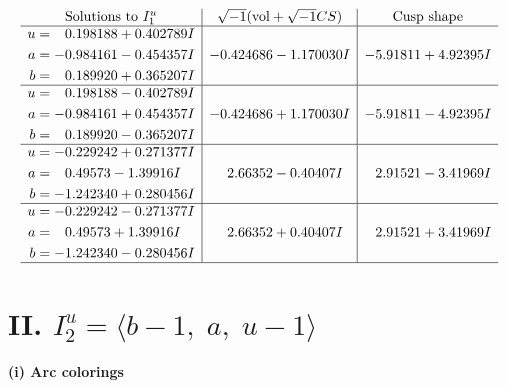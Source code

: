 \documentclass[1p]{elsarticle_modified}
\theoremstyle{definition}
\newcommand{\I}{\sqrt{-1}}
\begin{document}
$$\begin{array}{c|c|c}
\text{Solutions to }I^u_{1}& \I (\text{vol} + \sqrt{-1}CS) & \text{Cusp shape}\\
 \hline 
\begin{aligned}
u &= \phantom{-}0.198188 + 0.402789 I \\
a &= -0.984161 - 0.454357 I \\
b &= \phantom{-}0.189920 + 0.365207 I\end{aligned}
 & -0.424686 - 1.170030 I & -5.91811 + 4.92395 I \\ \hline\begin{aligned}
u &= \phantom{-}0.198188 - 0.402789 I \\
a &= -0.984161 + 0.454357 I \\
b &= \phantom{-}0.189920 - 0.365207 I\end{aligned}
 & -0.424686 + 1.170030 I & -5.91811 - 4.92395 I \\ \hline\begin{aligned}
u &= -0.229242 + 0.271377 I \\
a &= \phantom{-}0.49573 - 1.39916 I \\
b &= -1.242340 + 0.280456 I\end{aligned}
 & \phantom{-}2.66352 - 0.40407 I & \phantom{-}2.91521 - 3.41969 I \\ \hline\begin{aligned}
u &= -0.229242 - 0.271377 I \\
a &= \phantom{-}0.49573 + 1.39916 I \\
b &= -1.242340 - 0.280456 I\end{aligned}
 & \phantom{-}2.66352 + 0.40407 I & \phantom{-}2.91521 + 3.41969 I\\
 \hline 
 \end{array}$$\newpage\newpage\renewcommand{\arraystretch}{1}
\centering \section*{II. $I^u_{2}= \langle b-1,\;a,\;u-1 \rangle$}
\flushleft \textbf{(i) Arc colorings}\\
\end{document}
